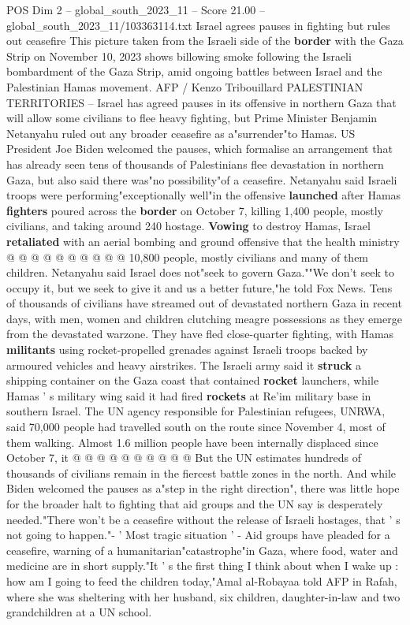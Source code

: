 \begin{textsample}{POS Dim 2 – global\_south\_2023\_11 – Score 21.00 – global\_south\_2023\_11/103363114.txt}  \label{ex:f2_pos_215}
Israel agrees pauses in fighting but rules out ceasefire This picture taken from the Israeli side of the \textbf{border} with the Gaza Strip on November 10, 2023 shows billowing smoke following the Israeli bombardment of the Gaza Strip, amid ongoing battles between Israel and the Palestinian Hamas movement.
AFP / Kenzo Tribouillard PALESTINIAN TERRITORIES -- Israel has agreed pauses in its offensive in northern Gaza that will allow some civilians to flee heavy fighting, but Prime Minister Benjamin Netanyahu ruled out any broader ceasefire as a"surrender"to Hamas.
US President Joe Biden welcomed the pauses, which formalise an arrangement that has already seen tens of thousands of Palestinians flee devastation in northern Gaza, but also said there was"no possibility"of a ceasefire.
Netanyahu said Israeli troops were performing"exceptionally well"in the offensive \textbf{launched} after Hamas \textbf{fighters} poured across the \textbf{border} on October 7, killing 1,400 people, mostly civilians, and taking around 240 hostage. \textbf{Vowing} to destroy Hamas, Israel \textbf{retaliated} with an aerial bombing and ground offensive that the health ministry @ @ @ @ @ @ @ @ @ @ 10,800 people, mostly civilians and many of them children.
Netanyahu said Israel does not"seek to govern Gaza.""We don't seek to occupy it, but we seek to give it and us a better future,"he told Fox News.
Tens of thousands of civilians have streamed out of devastated northern Gaza in recent days, with men, women and children clutching meagre possessions as they emerge from the devastated warzone.
They have fled close-quarter fighting, with Hamas \textbf{militants} using rocket-propelled grenades against Israeli troops backed by armoured vehicles and heavy airstrikes.
The Israeli army said it \textbf{struck} a shipping container on the Gaza coast that contained \textbf{rocket} launchers, while Hamas ' s military wing said it had fired \textbf{rockets} at Re'im military base in southern Israel.
The UN agency responsible for Palestinian refugees, UNRWA, said 70,000 people had travelled south on the route since November 4, most of them walking.
Almost 1.6 million people have been internally displaced since October 7, it @ @ @ @ @ @ @ @ @ @ But the UN estimates hundreds of thousands of civilians remain in the fiercest battle zones in the north.
And while Biden welcomed the pauses as a"step in the right direction", there was little hope for the broader halt to fighting that aid groups and the UN say is desperately needed."There won't be a ceasefire without the release of Israeli hostages, that ' s not going to happen."- ' Most tragic situation ' - Aid groups have pleaded for a ceasefire, warning of a humanitarian"catastrophe"in Gaza, where food, water and medicine are in short supply."It ' s the first thing I think about when I wake up : how am I going to feed the children today,"Amal al-Robayaa told AFP in Rafah, where she was sheltering with her husband, six children, daughter-in-law and two grandchildren at a UN school.

\end{textsample}
